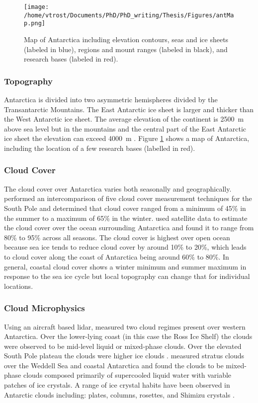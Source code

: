 \begin{figure}[H]
	\centering
	\texttt{[image: /home/vtrost/Documents/PhD/PhD\_writing/Thesis/Figures/antMap.png]}
	\caption{Map of Antarctica including elevation contours, seas and ice sheets (labeled in blue), regions and mount ranges (labeled in black), and research bases (labeled in red). \citep{antMap}}
	\label{fig:antMap}
\end{figure}

\subsubsection{Topography}
Antarctica is divided into two asymmetric hemispheres divided by the Transantarctic Mountains. The East Antarctic ice sheet is larger and thicker than the West Antarctic ice sheet. The average elevation of the continent is \SI{2500}{m} above sea level but in the mountains and the central part of the East Antarctic ice sheet the elevation can exceed \SI{4000}{m} \citep{antTop}. Figure \ref{fig:antMap} shows a map of Antarctica, including the location of a few research bases (labelled in red).

\subsubsection{Cloud Cover}
The cloud cover over Antarctica varies both seasonally and geographically. \cite{town2007} performed an intercomparison of five cloud cover measurement techniques for the South Pole and determined that cloud cover ranged from a minimum of 45\% in the summer to a maximum of 65\% in the winter. \cite{brom2012} used satellite data to estimate the cloud cover over the ocean surrounding Antarctica and found it to range from 80\% to 95\% across all seasons. The cloud cover is highest over open ocean because sea ice tends to reduce cloud cover by around 10\% to 20\%, which leads to cloud cover along the coast of Antarctica being around 60\% to 80\%. In general, coastal cloud cover shows a winter minimum and summer maximum in response to the sea ice cycle but local topography can change that for individual locations. \citep{adhi2012}

\subsubsection{Cloud Microphysics}
Using an aircraft based lidar, \cite{morl1989} measured two cloud regimes present over western Antarctica. Over the lower-lying coast (in this case the Ross Ice Shelf) the clouds were observed to be mid-level liquid or mixed-phase clouds. Over the elevated South Pole plateau the clouds were higher ice clouds \citep{morl1989, lach2010}. \cite{oshea2017} measured stratus clouds over the Weddell Sea and coastal Antarctica and found the clouds to be mixed-phase clouds composed primarily of supercooled liquid water with variable patches of ice crystals. A range of ice crystal habits have been observed in Antarctic clouds including: plates, columns, rosettes, and Shimizu crystals \citep{laws2006, lach2010}.

